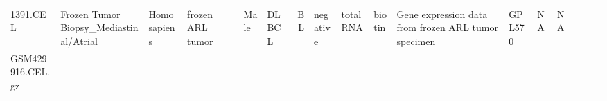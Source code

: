 \documentclass[]{article}
\begin{document}
\begin{longtable}[]{@{}lllllllrllllllllll@{}}
\begin{minipage}[t]{0.02\columnwidth}
1391.CEL\strut
\end{minipage} & \begin{minipage}[t]{0.06\columnwidth}\raggedright
Frozen Tumor Biopsy\_Mediastinal/Atrial\strut
\end{minipage} & \begin{minipage}[t]{0.02\columnwidth}\raggedright
Homo sapiens\strut
\end{minipage} & \begin{minipage}[t]{0.04\columnwidth}\raggedright
frozen ARL tumor\strut
\end{minipage} & \begin{minipage}[t]{0.05\columnwidth}\raggedleft
38\strut
\end{minipage} & \begin{minipage}[t]{0.04\columnwidth}\raggedright
Male\strut
\end{minipage} & \begin{minipage}[t]{0.06\columnwidth}\raggedright
DLBCL\strut
\end{minipage} & \begin{minipage}[t]{0.06\columnwidth}\raggedright
BL\strut
\end{minipage} & \begin{minipage}[t]{0.04\columnwidth}\raggedright
negative\strut
\end{minipage} & \begin{minipage}[t]{0.02\columnwidth}\raggedright
total RNA\strut
\end{minipage} & \begin{minipage}[t]{0.01\columnwidth}\raggedright
biotin\strut
\end{minipage} & \begin{minipage}[t]{0.08\columnwidth}\raggedright
Gene expression data from frozen ARL tumor specimen\strut
\end{minipage} & \begin{minipage}[t]{0.01\columnwidth}\raggedright
GPL570\strut
\end{minipage} & \begin{minipage}[t]{0.00\columnwidth}\raggedright
NA\strut
\end{minipage} & \begin{minipage}[t]{0.01\columnwidth}\raggedright
NA\strut
\end{minipage}\tabularnewline
\begin{minipage}[t]{0.03\columnwidth}\raggedright
GSM429916.CEL.gz\strut
\end{minipage} & \begin{minipage}[t]{0.02\columnwidth}\raggedright

\end{minipage}
\end{longtable}
\end{document}
